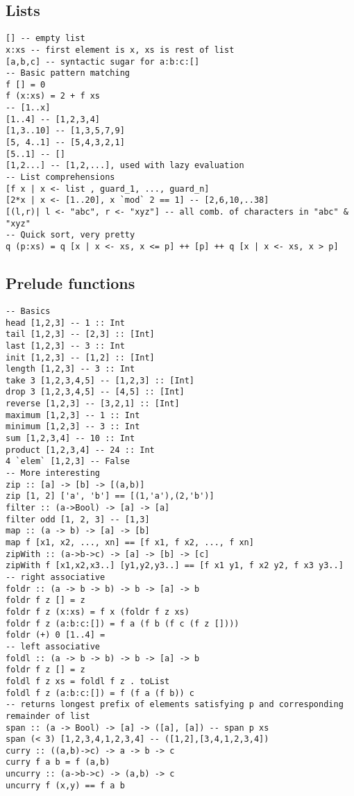 \documentclass[12pt]{article}
\begin{document}
\subsection{Lists}
\begin{verbatim}
[] -- empty list
x:xs -- first element is x, xs is rest of list
[a,b,c] -- syntactic sugar for a:b:c:[]
-- Basic pattern matching
f [] = 0
f (x:xs) = 2 + f xs
-- [1..x]
[1..4] -- [1,2,3,4]
[1,3..10] -- [1,3,5,7,9]
[5, 4..1] -- [5,4,3,2,1] 
[5..1] -- []
[1,2...] -- [1,2,...], used with lazy evaluation
-- List comprehensions
[f x | x <- list , guard_1, ..., guard_n]
[2*x | x <- [1..20], x `mod` 2 == 1] -- [2,6,10,..38]
[(l,r)| l <- "abc", r <- "xyz"] -- all comb. of characters in "abc" & "xyz"
-- Quick sort, very pretty
q (p:xs) = q [x | x <- xs, x <= p] ++ [p] ++ q [x | x <- xs, x > p]
\end{verbatim}

\subsection{Prelude functions}
\begin{verbatim}
-- Basics
head [1,2,3] -- 1 :: Int
tail [1,2,3] -- [2,3] :: [Int]
last [1,2,3] -- 3 :: Int
init [1,2,3] -- [1,2] :: [Int]
length [1,2,3] -- 3 :: Int
take 3 [1,2,3,4,5] -- [1,2,3] :: [Int]
drop 3 [1,2,3,4,5] -- [4,5] :: [Int]
reverse [1,2,3] -- [3,2,1] :: [Int]
maximum [1,2,3] -- 1 :: Int
minimum [1,2,3] -- 3 :: Int
sum [1,2,3,4] -- 10 :: Int
product [1,2,3,4] -- 24 :: Int
4 `elem` [1,2,3] -- False
-- More interesting
zip :: [a] -> [b] -> [(a,b)]
zip [1, 2] ['a', 'b'] == [(1,'a'),(2,'b')]
filter :: (a->Bool) -> [a] -> [a]
filter odd [1, 2, 3] -- [1,3]
map :: (a -> b) -> [a] -> [b]
map f [x1, x2, ..., xn] == [f x1, f x2, ..., f xn]
zipWith :: (a->b->c) -> [a] -> [b] -> [c]
zipWith f [x1,x2,x3..] [y1,y2,y3..] == [f x1 y1, f x2 y2, f x3 y3..]
-- right associative
foldr :: (a -> b -> b) -> b -> [a] -> b
foldr f z [] = z
foldr f z (x:xs) = f x (foldr f z xs)
foldr f z (a:b:c:[]) = f a (f b (f c (f z [])))
foldr (+) 0 [1..4] = 
-- left associative
foldl :: (a -> b -> b) -> b -> [a] -> b
foldr f z [] = z
foldl f z xs = foldl f z . toList
foldl f z (a:b:c:[]) = f (f a (f b)) c
-- returns longest prefix of elements satisfying p and corresponding remainder of list
span :: (a -> Bool) -> [a] -> ([a], [a]) -- span p xs
span (< 3) [1,2,3,4,1,2,3,4] -- ([1,2],[3,4,1,2,3,4])
curry :: ((a,b)->c) -> a -> b -> c
curry f a b = f (a,b)
uncurry :: (a->b->c) -> (a,b) -> c
uncurry f (x,y) == f a b
\end{verbatim}
\end{document}
